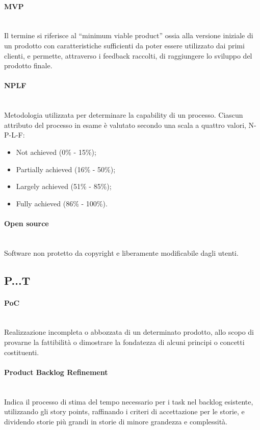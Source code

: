 \paragraph{MVP}~\smallskip \\
Il termine si riferisce al “minimum viable product” ossia alla versione iniziale di un prodotto con 
caratteristiche sufficienti da poter essere utilizzato dai primi clienti, e permette, attraverso i feedback raccolti, di raggiungere lo sviluppo del prodotto finale.

\paragraph{NPLF}~\smallskip \\
Metodologia utilizzata per determinare la capability di un processo. Ciascun attributo del processo in esame è valutato secondo una scala a quattro valori, N-P-L-F:
\begin{itemize}
	\item Not achieved (0\% - 15\%);
	\item Partially achieved (16\% - 50\%);
	\item Largely achieved (51\% - 85\%);
    \item Fully achieved (86\% - 100\%).
\end{itemize}

\paragraph{Open source}~\smallskip \\
Software non protetto da copyright e liberamente modificabile dagli utenti.

\subsection{P...T}

\paragraph{PoC}~\smallskip \\
Realizzazione incompleta o abbozzata di un determinato prodotto, allo scopo di provarne la fattibilità o dimostrare la fondatezza di alcuni principi o concetti costituenti.

\paragraph{Product Backlog Refinement}~\smallskip \\
Indica il processo di stima del tempo necessario per i task nel backlog esistente, utilizzando gli story points, 
raffinando i criteri di accettazione per le storie, e dividendo storie più grandi in storie di minore grandezza e complessità.

